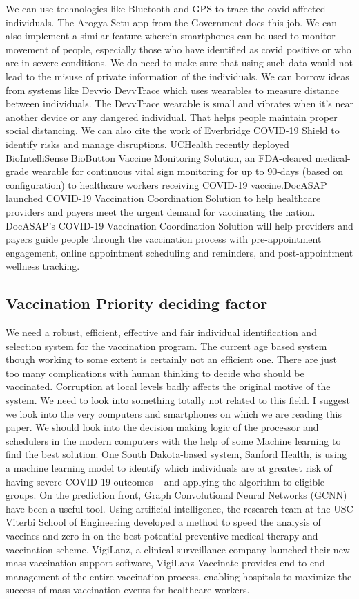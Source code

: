 \documentclass[10pt,twocolumn,letterpaper]{article}
\begin{document}
We can use technologies like Bluetooth and GPS to trace the covid affected individuals. The Arogya Setu app from the Government does this job. We can also implement a similar feature wherein smartphones can be used to monitor movement of people, especially those who have identified as covid positive or who are in severe conditions.
We do need to make sure that using such data would not lead to the misuse of private information of the individuals. We can borrow ideas from systems like Devvio DevvTrace  which uses wearables to measure distance between individuals. The DevvTrace wearable is small and vibrates when it's near another device or any dangered individual. That helps people maintain proper social distancing. We can also cite the work of Everbridge COVID-19 Shield to identify risks and manage disruptions. UCHealth\cite{uchealth} recently deployed BioIntelliSense BioButton Vaccine Monitoring Solution, an FDA-cleared medical-grade wearable for continuous vital sign monitoring for up to 90-days (based on configuration) to healthcare workers receiving COVID-19 vaccine.DocASAP\cite{docasap} launched COVID-19 Vaccination Coordination Solution to help healthcare providers and payers meet the urgent demand for vaccinating the nation. DocASAP’s COVID-19 Vaccination Coordination Solution will help providers and payers guide people through the vaccination process with pre-appointment engagement, online appointment scheduling and reminders, and post-appointment wellness tracking.




\subsection{Vaccination Priority deciding factor}
We need a robust, efficient, effective and fair individual identification and selection system for the vaccination program. The current age based system though working to some extent is certainly not an efficient one. There are just too many complications with human thinking to decide who should be vaccinated. Corruption at local levels badly affects the original motive of the system. We need to look into something totally not related to this field. I suggest we look into the very computers and smartphones on which we are reading this paper. We should look into the decision making logic of the processor and schedulers in the modern computers with the help of some Machine learning to find the best solution. One South Dakota-based system, Sanford Health, is using a machine learning model to identify which individuals are at greatest risk of having severe COVID-19 outcomes – and applying the algorithm to eligible groups. On the prediction front, Graph Convolutional Neural Networks (GCNN) have been a useful tool. Using artificial intelligence, the research team at the USC Viterbi School of Engineering\cite{usc} developed a method to speed the analysis of vaccines and zero in on the best potential preventive medical therapy and vaccination scheme. VigiLanz\cite{vigilanz}, a clinical surveillance company launched their new mass vaccination support software, VigiLanz Vaccinate provides end-to-end management of the entire vaccination process, enabling hospitals to maximize the success of mass vaccination events for healthcare workers.
\end{document}
